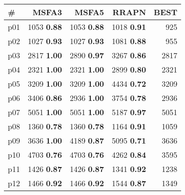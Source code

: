 \begin{tabular}{lrrrr}
\toprule
\textbf{\#} & \textbf{MSFA3} & \textbf{MSFA5} & \textbf{RRAPN} & \textbf{BEST}\\
\midrule
\multicolumn{1}{l|}{p01} & {\footnotesize 1053} \textbf{0.88} & {\footnotesize 1053} \textbf{0.88} & {\footnotesize 1018} \textbf{0.91} & \multicolumn{1}{|r}{925}\\
\multicolumn{1}{l|}{p02} & {\footnotesize 1027} \textbf{0.93} & {\footnotesize 1027} \textbf{0.93} & {\footnotesize 1081} \textbf{0.88} & \multicolumn{1}{|r}{955}\\
\multicolumn{1}{l|}{p03} & {\footnotesize 2817} \textbf{1.00} & {\footnotesize 2890} \textbf{0.97} & {\footnotesize 3267} \textbf{0.86} & \multicolumn{1}{|r}{2817}\\
\multicolumn{1}{l|}{p04} & {\footnotesize 2321} \textbf{1.00} & {\footnotesize 2321} \textbf{1.00} & {\footnotesize 2899} \textbf{0.80} & \multicolumn{1}{|r}{2321}\\
\multicolumn{1}{l|}{p05} & {\footnotesize 3209} \textbf{1.00} & {\footnotesize 3209} \textbf{1.00} & {\footnotesize 4434} \textbf{0.72} & \multicolumn{1}{|r}{3209}\\
\multicolumn{1}{l|}{p06} & {\footnotesize 3406} \textbf{0.86} & {\footnotesize 2936} \textbf{1.00} & {\footnotesize 3754} \textbf{0.78} & \multicolumn{1}{|r}{2936}\\
\multicolumn{1}{l|}{p07} & {\footnotesize 5051} \textbf{1.00} & {\footnotesize 5051} \textbf{1.00} & {\footnotesize 5187} \textbf{0.97} & \multicolumn{1}{|r}{5051}\\
\multicolumn{1}{l|}{p08} & {\footnotesize 1360} \textbf{0.78} & {\footnotesize 1360} \textbf{0.78} & {\footnotesize 1164} \textbf{0.91} & \multicolumn{1}{|r}{1059}\\
\multicolumn{1}{l|}{p09} & {\footnotesize 3636} \textbf{1.00} & {\footnotesize 4189} \textbf{0.87} & {\footnotesize 5095} \textbf{0.71} & \multicolumn{1}{|r}{3636}\\
\multicolumn{1}{l|}{p10} & {\footnotesize 4703} \textbf{0.76} & {\footnotesize 4703} \textbf{0.76} & {\footnotesize 4262} \textbf{0.84} & \multicolumn{1}{|r}{3595}\\
\multicolumn{1}{l|}{p11} & {\footnotesize 1426} \textbf{0.87} & {\footnotesize 1426} \textbf{0.87} & {\footnotesize 1341} \textbf{0.92} & \multicolumn{1}{|r}{1238}\\
\multicolumn{1}{l|}{p12} & {\footnotesize 1466} \textbf{0.92} & {\footnotesize 1466} \textbf{0.92} & {\footnotesize 1544} \textbf{0.87} & \multicolumn{1}{|r}{1349}\\

\end{tabular}
